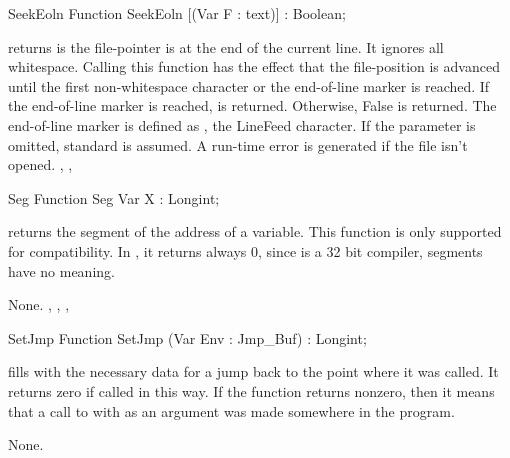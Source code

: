 \documentclass{report}
\begin{document}
\begin{function}{SeekEoln}
\Declaration
Function SeekEoln [(Var F : text)] : Boolean;

\Description
{} returns  is the file-pointer is at the end of the
current line. It ignores all whitespace.
Calling this function has the effect that the file-position is advanced
until the first non-whitespace character or the end-of-line marker is
reached.
If the end-of-line marker is reached,  is returned. Otherwise,
False is returned.
The end-of-line marker is defined as , the LineFeed character.
If the parameter  is omitted, standard  is assumed.
\Errors
A run-time error is generated if the file  isn't opened.
\SeeAlso
{}, , 
\end{function}
\html{}
\begin{function}{Seg}
\Declaration
Function Seg Var X : Longint;

\Description
{} returns the segment of the address of a variable. 
This function is only supported for compatibility. In \fpc, it 
returns always 0, since \fpc is a 32 bit compiler, segments have no meaning.

\Errors
None.
\SeeAlso
{}, , , 
\end{function}
\html{}
\begin{function}{SetJmp}
\Declaration
Function SetJmp (Var Env : Jmp\_Buf) : Longint;

\Description

 fills  with the necessary data for a jump back to the
point where it was called. It returns zero if called in this way.
If the function returns nonzero, then it means that a call to 
with  as an argument was made somewhere in the program.

\Errors
None.
\SeeAlso
{}
\end{function}
\html{}
\end{document}
